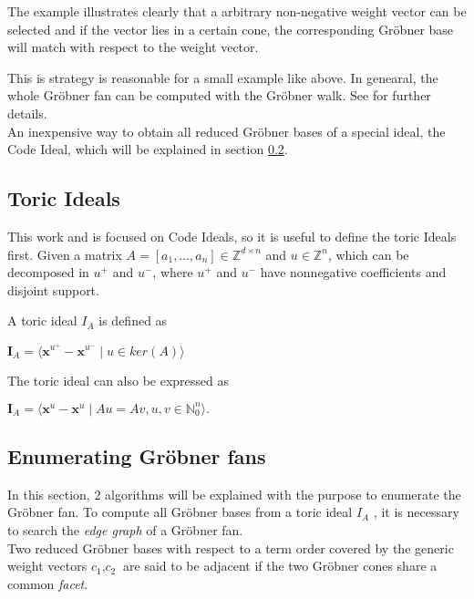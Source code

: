 The example illustrates clearly that a arbitrary non-negative weight vector can be selected and if the vector lies in a certain cone, the corresponding Gröbner base will match with respect to the weight vector.  


This is strategy is reasonable for a small example like above.
In genearal, the whole Gröbner fan can be computed with the Gröbner walk.
See \cite{coxOshea} for further details.\\
An inexpensive way to obtain all reduced Gröbner bases of a special ideal, the Code Ideal, which will be explained in section \ref{subsec:enumerate}.

\subsection{Toric Ideals}
\label{subsec:toric}
This work and is focused on Code Ideals, so it is useful to define the toric Ideals first. Given a matrix $A =\left[a_{1},\dots, a_{n}  \right] \in \mathbb{Z}^{d \times n } $ and $u \in \mathbb{Z}^{n}$, which can be decomposed in $u^{+} $ and $u^{-}$, where $u^{+} $ and $u^{-}$ have nonnegative coefficients and disjoint support.

\begin{env_definition}
\cite{dueckjournal} A toric ideal $I_{A}$ is defined as
\begin{center}
$ \textbf{I}_{A} = \langle \textbf{x}^{u^{+}} - \textbf{x}^{u^{-}} \mid u \in ker \left(  A \right) \rangle  $
\end{center}


\end{env_definition}

The toric ideal can also be expressed as
\begin{center}
$ \textbf{I}_{A} =  \langle \textbf{x}^{u} - \textbf{x}^{u} \mid Au = Av, u,v \in \mathbb{N}^{n}_{0} \rangle .$
\end{center}



\subsection{Enumerating Gröbner fans}
\label{subsec:enumerate}

In this section, 2 algorithms will be explained with the  purpose to enumerate the Gröbner fan.
To compute all Gröbner bases from a toric ideal $I_A$ , it is necessary to search the \textit{edge graph} of a Gröbner fan.\\
Two reduced Gröbner bases with respect to a term order covered by the generic weight vectors $c_{1}$,$c_{2}~$ are said to be adjacent if the two Gröbner cones share a common \textit{facet}.

